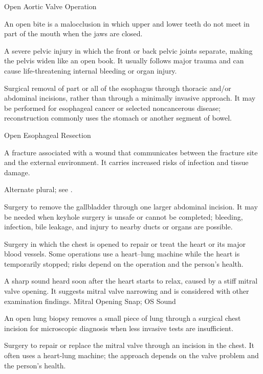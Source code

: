 \synonyms
Open Aortic Valve Operation

 An open bite is a malocclusion in which upper and lower teeth do not meet in part of the mouth when the jaws are closed.

 A severe pelvic injury in which the front or back pelvic joints separate, making the pelvis widen like an open book. It usually follows major trauma and can cause life-threatening internal bleeding or organ injury.

 Surgical removal of part or all of the esophagus
through thoracic and/or abdominal incisions, rather than through a minimally
invasive approach. It may be performed for esophageal cancer or selected
noncancerous disease; reconstruction commonly uses the stomach or another segment of
bowel.

\synonyms
Open Esophageal Resection

 A fracture associated with a wound that communicates between the fracture site and the external environment. It carries increased risks of infection and tissue damage.

 Alternate plural; see .

 Surgery to remove the gallbladder through one larger abdominal incision. It may be needed when keyhole surgery is unsafe or cannot be completed; bleeding, infection, bile leakage, and injury to nearby ducts or organs are possible.

 Surgery in which the chest is opened to repair or treat the heart or its major blood vessels. Some operations use a heart–lung machine while the heart is temporarily stopped; risks depend on the operation and the person’s health.

 A sharp sound heard soon after the heart starts to relax, caused by a stiff mitral valve opening. It suggests mitral valve narrowing and is considered with other examination findings.
\synonyms
Mitral Opening Snap; OS Sound

 An open lung biopsy removes a small piece of lung through a surgical chest incision for microscopic diagnosis when less invasive tests are insufficient.

 Surgery to repair or replace the mitral valve through an incision in the chest. It often uses a heart-lung machine; the approach depends on the valve problem and the person's health.

